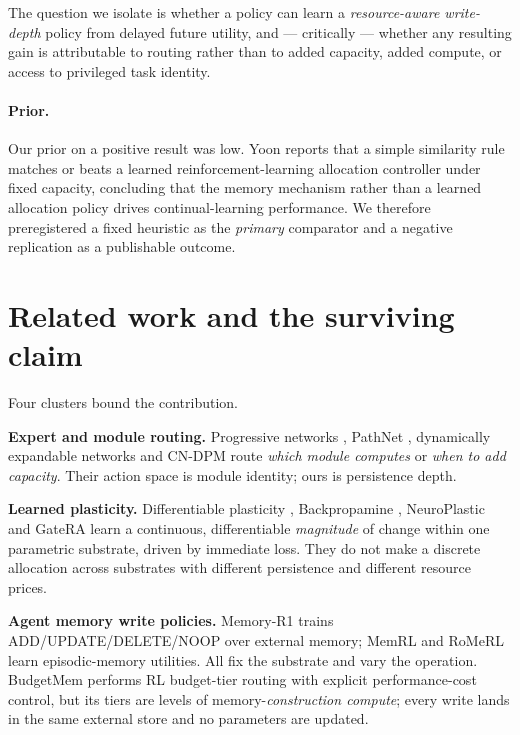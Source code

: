 \documentclass[11pt]{article}
\begin{document}
The question we isolate is whether a policy can learn a \emph{resource-aware
write-depth} policy from delayed future utility, and --- critically --- whether
any resulting gain is attributable to routing rather than to added capacity,
added compute, or access to privileged task identity.

\paragraph{Prior.} Our prior on a positive result was low. Yoon
\cite{yoon2026subspace} reports that a simple similarity rule matches or beats a
learned reinforcement-learning allocation controller under fixed capacity,
concluding that the memory mechanism rather than a learned allocation policy
drives continual-learning performance. We therefore preregistered a fixed
heuristic as the \emph{primary} comparator and a negative replication as a
publishable outcome.

\section{Related work and the surviving claim}

Four clusters bound the contribution.

\textbf{Expert and module routing.} Progressive networks \cite{rusu2016progressive},
PathNet \cite{fernando2017pathnet}, dynamically expandable networks
\cite{yoon2017den} and CN-DPM \cite{lee2020cndpm} route \emph{which module
computes} or \emph{when to add capacity}. Their action space is module identity;
ours is persistence depth.

\textbf{Learned plasticity.} Differentiable plasticity \cite{miconi2018diffplasticity},
Backpropamine \cite{miconi2020backpropamine}, NeuroPlastic
\cite{jiang2026neuroplastic} and GateRA \cite{ou2025gatera} learn a continuous,
differentiable \emph{magnitude} of change within one parametric substrate,
driven by immediate loss. They do not make a discrete allocation across
substrates with different persistence and different resource prices.

\textbf{Agent memory write policies.} Memory-R1 \cite{yan2025memoryr1} trains
ADD/UPDATE/DELETE/NOOP over external memory; MemRL \cite{zhang2026memrl} and
RoMeRL \cite{yang2026romerl} learn episodic-memory utilities. All fix the
substrate and vary the operation. BudgetMem \cite{zhang2026budgetmem} performs
RL budget-tier routing with explicit performance-cost control, but its tiers are
levels of memory-\emph{construction compute}; every write lands in the same
external store and no parameters are updated.
\end{document}
